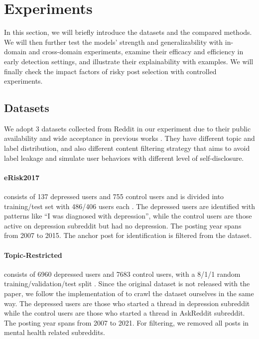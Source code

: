 \section{Experiments}

In this section, we will briefly introduce the datasets and the compared methods. We will then further test the models' strength and generalizability with in-domain and cross-domain experiments, examine their efficacy and efficiency in early detection settings, and illustrate their explainability with examples. We will finally check the impact factors of risky post selection with controlled experiments.

\subsection{Datasets}

We adopt 3 datasets collected from Reddit in our experiment due to their public availability and wide acceptance in previous works \citep{losada2017erisk, trotzek2018utilizing,harrigian2020models}. They have different topic and label distribution, and also different content filtering strategy that aims to avoid label leakage and simulate user behaviors with different level of self-disclosure.

\paragraph{eRisk2017} consists of 137 depressed users and 755 control users and is divided into training/test set with 486/406 users each \citep{losada2016test}. The depressed users are identified with patterns like ``I was diagnosed with depression'', while the control users are those active on depression subreddit but had no depression. The posting year spans from 2007 to 2015. The anchor post for identification is filtered from the dataset.

\paragraph{Topic-Restricted} consists of 6960 depressed users and 7683 control users, with a 8/1/1 random training/validation/test split \citep{wolohan2018detecting}. Since the original dataset is not released with the paper, we follow the implementation of \citet{harrigian2020models} to crawl the dataset ourselves in the same way. The depressed users are those who started a thread in depression subreddit while the control users are those who started a thread in AskReddit subreddit. The posting year spans from 2007 to 2021. For filtering, we removed all posts in mental health related subreddits.

